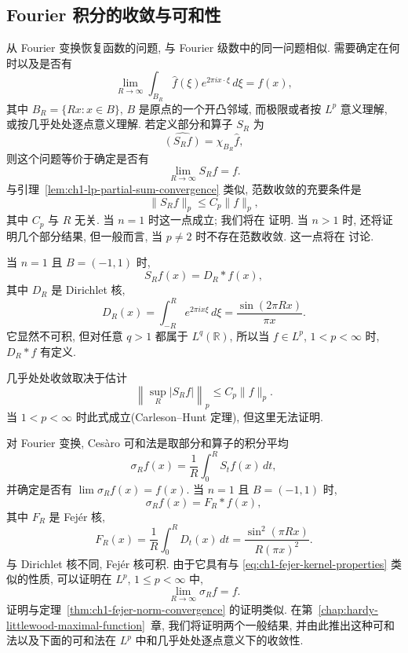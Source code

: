 \subsection{Fourier 积分的收敛与可和性}
\label{sec:ch1-fourier-integral-convergence-summability}

从 Fourier 变换恢复函数的问题, 与 Fourier 级数中的同一问题相似. 需要确定在何时以及是否有
\[
 \lim_{R\to\infty}\int_{B_R}\widehat f(\xi)e^{2\pi ix\cdot\xi}\,d\xi=f(x),
\]
其中 $B_R=\{Rx:x\in B\}$, $B$ 是原点的一个开凸邻域, 而极限或者按 $L^p$ 意义理解, 或按几乎处处逐点意义理解. 若定义部分和算子 $S_R$ 为
\[
 \widehat{(S_Rf)}=\chi_{B_R}\widehat f,
\]
则这个问题等价于确定是否有
\[
 \lim_{R\to\infty}S_Rf=f.
\]
与引理~\ref{lem:ch1-lp-partial-sum-convergence} 类似, 范数收敛的充要条件是
\[
 \|S_Rf\|_p\le C_p\|f\|_p,
\]
其中 $C_p$ 与 $R$ 无关. 当 $n=1$ 时这一点成立; 我们将在  证明. 当 $n>1$ 时, 还将证明几个部分结果, 但一般而言, 当 $p\ne2$ 时不存在范数收敛. 这一点将在  讨论.

当 $n=1$ 且 $B=(-1,1)$ 时,
\[
 S_Rf(x)=D_R*f(x),
\]
\hypertarget{chapter-01-page-030}{}
其中 $D_R$ 是 Dirichlet 核,
\[
 D_R(x)=\int_{-R}^{R}e^{2\pi ix\xi}\,d\xi
 =\frac{\sin(2\pi Rx)}{\pi x}.
\]
它显然不可积, 但对任意 $q>1$ 都属于 $L^q(\mathbb R)$, 所以当 $f\in L^p$, $1<p<\infty$ 时, $D_R*f$ 有定义.

几乎处处收敛取决于估计
\[
 \left\|\sup_R|S_Rf|\right\|_p\le C_p\|f\|_p.
\]
当 $1<p<\infty$ 时此式成立(Carleson--Hunt 定理), 但这里无法证明.

对 Fourier 变换, Cesàro 可和法是取部分和算子的积分平均
\[
 \sigma_Rf(x)=\frac1R\int_0^RS_tf(x)\,dt,
\]
并确定是否有 $\lim\sigma_Rf(x)=f(x)$. 当 $n=1$ 且 $B=(-1,1)$ 时,
\[
 \sigma_Rf(x)=F_R*f(x),
\]
其中 $F_R$ 是 Fejér 核,
\begin{equation}
\label{eq:ch1-fourier-integral-fejer-kernel}
 F_R(x)=\frac1R\int_0^RD_t(x)\,dt
 =\frac{\sin^2(\pi Rx)}{R(\pi x)^2}.
\end{equation}
与 Dirichlet 核不同, Fejér 核可积. 由于它具有与 \eqref{eq:ch1-fejer-kernel-properties} 类似的性质, 可以证明在 $L^p$, $1\le p<\infty$ 中,
\[
 \lim_{R\to\infty}\sigma_Rf=f.
\]
证明与定理~\ref{thm:ch1-fejer-norm-convergence} 的证明类似. 在第~\ref{chap:hardy-littlewood-maximal-function}~章, 我们将证明两个一般结果, 并由此推出这种可和法以及下面的可和法在 $L^p$ 中和几乎处处逐点意义下的收敛性.

